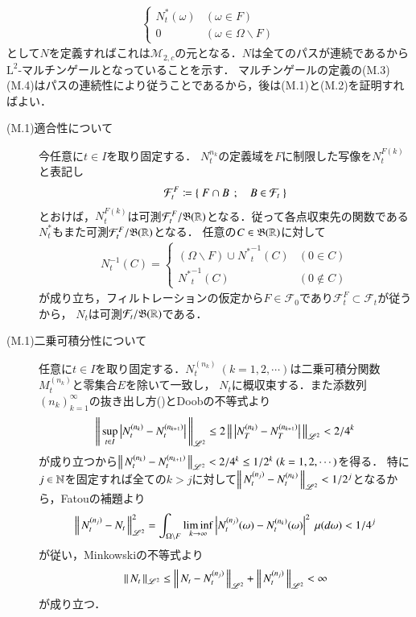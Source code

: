\begin{prf}
\begin{align}
			\begin{cases}
				N^*_t(\omega) & (\omega \in F) \\
				0 & (\omega \in \Omega \backslash F)
			\end{cases}
		\end{align}
		として$N$を定義すればこれは$\mathcal{M}_{2,c}$の元となる．$N$は全てのパスが連続であるから$\mathrm{L}^2$-マルチンゲールとなっていることを示す．
		マルチンゲールの定義の(M.3)(M.4)はパスの連続性により従うことであるから，後は(M.1)と(M.2)を証明すればよい．
		\begin{description}
			\item[(M.1)適合性について]
				今任意に$t \in I$を取り固定する．
				$N^{n_k}_t$の定義域を$F$に制限した写像を$N^{F(k)}_t$と表記し
				\begin{align}
					\mathcal{F}^F_t \coloneqq \left\{\ F \cap B\ \, ; \quad B \in \mathcal{F}_t\ \right\}
				\end{align}
				とおけば，$N^{F(k)}_t$は可測$\mathcal{F}^F_t/\mathfrak{B}(\mathbb{R})$となる．従って各点収束先の関数である$N^*_t$もまた可測$\mathcal{F}^F_t/\mathfrak{B}(\mathbb{R})$となる．
				任意の$C \in \mathfrak{B}(\mathbb{R})$に対して
				\begin{align}
					N^{-1}_t(C) = 
					\begin{cases}
						(\Omega \backslash F) \cup {N^*}^{-1}_t(C) & (0 \in C) \\
						{N^*}^{-1}_t(C) & (0 \notin C)
					\end{cases}
				\end{align}
				が成り立ち，フィルトレーションの仮定から$F \in \mathcal{F}_0$であり$\mathcal{F}^F_t \subset \mathcal{F}_t$が従うから，
				$N_t$は可測$\mathcal{F}_t/\mathfrak{B}(\mathbb{R})$である．
			
			\item[(M.1)二乗可積分性について]
				任意に$t \in I$を取り固定する．$N^{(n_k)}_t\ (k=1,2,\cdots)$は二乗可積分関数$M^{(n_k)}_t$と零集合$E$を除いて一致し，
				$N_t$に概収束する．また添数列$(n_k)_{k=1}^{\infty}$の抜き出し方()とDoobの不等式より
				\begin{align}
					\left\|\, \operatorname*{sup}_{t \in I} \left|N^{(n_k)}_t - N^{(n_{k+1})}_t\right|\, \right\|_{\mathscr{L}^2} \leq 2 \left\|\, \left|N^{(n_k)}_T - N^{(n_{k+1})}_T\right|\, \right\|_{\mathscr{L}^2} < 2/4^k
				\end{align}
				が成り立つから$\left\|\, N^{(n_k)}_t - N^{(n_{k+1})}_t\, \right\|_{\mathscr{L}^2} < 2/4^k \leq 1/2^k \ (k=1,2,\cdots)$を得る．
				特に$j \in \mathbb{N}$を固定すれば全ての$k > j$に対して$\left\|\, N^{(n_j)}_t - N^{(n_k)}_t\, \right\|_{\mathscr{L}^2} < 1/2^j$となるから，Fatouの補題より
				\begin{align}
					\left\|\, N^{(n_j)}_t - N_t\, \right\|_{\mathscr{L}^2}^2 = \int_{\Omega \backslash F} \liminf_{k \to \infty} \left| N^{(n_j)}_t(\omega) - N^{(n_k)}_t(\omega) \right|^2\ \mu(d\omega)
					< 1/4^j
					\label{eq:M_c2_hilbert_2}
				\end{align}
				が従い，Minkowskiの不等式より
				\begin{align}
					\left\|\, N_t\, \right\|_{\mathscr{L}^2} \leq \left\|\, N_t - N^{(n_j)}_t\, \right\|_{\mathscr{L}^2} + \left\|\, N^{(n_j)}_t\, \right\|_{\mathscr{L}^2} < \infty
				\end{align}
				が成り立つ．
			

\end{description}
\end{prf}
